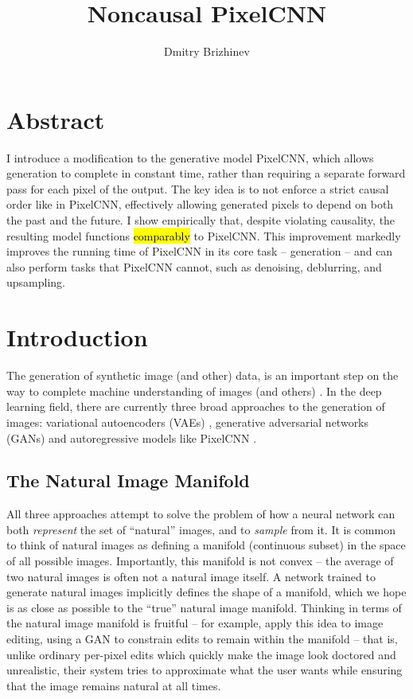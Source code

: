 \documentclass[10pt,a4paper]{article}
\newcommand{\nquote}[1]{``{#1}''}
\begin{document}
\title{\vspace{-10ex}Noncausal PixelCNN}
\author{Dmitry Brizhinev}
\maketitle

\section{Abstract}
I introduce a modification to the generative model PixelCNN, which allows generation to complete in constant time, rather than requiring a separate forward pass for each pixel of the output. The key idea is to not enforce a strict causal order like in PixelCNN, effectively allowing generated pixels to depend on both the past and the future. I show empirically that, despite violating causality, the resulting model functions \hl{comparably} to PixelCNN. This improvement markedly improves the running time of PixelCNN in its core task -- generation -- and can also perform tasks that PixelCNN cannot, such as denoising, deblurring, and upsampling.

\section{Introduction}

The generation of synthetic image (and other) data, is an important step on the way to complete machine understanding of images (and others) \cite{??}. In the deep learning field, there are currently three broad approaches to the generation of images: variational autoencoders (VAEs) \cite{??}, generative adversarial networks (GANs) \cite{??} and autoregressive models like PixelCNN \cite{??}.

\subsection{The Natural Image Manifold}

All three approaches attempt to solve the problem of how a neural network can both \emph{represent} the set of \nquote{natural} images, and to \emph{sample} from it. It is common to think of natural images as defining a manifold (continuous subset) in the space of all possible images. Importantly, this manifold is not convex -- the average of two natural images is often not a natural image itself. A network trained to generate natural images implicitly defines the shape of a manifold, which we hope is as close as possible to the \nquote{true} natural image manifold. Thinking in terms of the natural image manifold is fruitful -- for example, \cite{??} apply this idea to image editing, using a GAN to constrain edits to remain within the manifold -- that is, unlike ordinary per-pixel edits which quickly make the image look doctored and unrealistic, their system tries to approximate what the user wants while ensuring that the image remains natural at all times.
\end{document}
